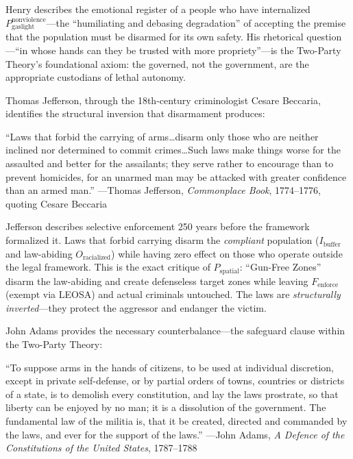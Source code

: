 \documentclass[12pt,openany]{book}
\begin{document}
Henry describes the emotional register of a people who have internalized $P_{\text{gaslight}}^{\text{nonviolence}}$---the ``humiliating and debasing degradation'' of accepting the premise that the population must be disarmed for its own safety. His rhetorical question---``in whose hands can they be trusted with more propriety''---is the Two-Party Theory's foundational axiom: the governed, not the government, are the appropriate custodians of lethal autonomy.

Thomas Jefferson, through the 18th-century criminologist Cesare Beccaria, identifies the structural inversion that disarmament produces:

\begin{historicalsource}
``Laws that forbid the carrying of arms\ldots disarm only those who are neither inclined nor determined to commit crimes\ldots Such laws make things worse for the assaulted and better for the assailants; they serve rather to encourage than to prevent homicides, for an unarmed man may be attacked with greater confidence than an armed man.'' \hfill ---Thomas Jefferson, \textit{Commonplace Book}, 1774--1776, quoting Cesare Beccaria
\end{historicalsource}

Jefferson describes selective enforcement 250 years before the framework formalized it. Laws that forbid carrying disarm the \textit{compliant} population ($I_{\text{buffer}}$ and law-abiding $O_{\text{racialized}}$) while having zero effect on those who operate outside the legal framework. This is the exact critique of $P_{\text{spatial}}$: ``Gun-Free Zones'' disarm the law-abiding and create defenseless target zones while leaving $F_{\text{enforce}}$ (exempt via LEOSA) and actual criminals untouched. The laws are \textit{structurally inverted}---they protect the aggressor and endanger the victim.

John Adams provides the necessary counterbalance---the safeguard clause within the Two-Party Theory:

\begin{historicalsource}
``To suppose arms in the hands of citizens, to be used at individual discretion, except in private self-defense, or by partial orders of towns, countries or districts of a state, is to demolish every constitution, and lay the laws prostrate, so that liberty can be enjoyed by no man; it is a dissolution of the government. The fundamental law of the militia is, that it be created, directed and commanded by the laws, and ever for the support of the laws.'' \hfill ---John Adams, \textit{A Defence of the Constitutions of the United States}, 1787--1788
\end{historicalsource}
\end{document}
